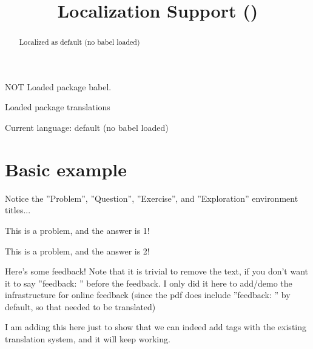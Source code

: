 \documentclass{ximera}
\title{Localization Support (\languagename)}
\providecommand{\languagename}{default (no babel loaded)}
\begin{document}
\begin{abstract}%
    Localized as \languagename
\end{abstract}
\maketitle

\makeatletter
{}       {\phantom{NOT }}{NOT } Loaded package babel.

 Loaded package translations

Current language: \languagename

\makeatother


\section*{Basic example}%
    
        Notice the ''Problem'', ''Question'', ''Exercise'', and ''Exploration'' environment titles... 
        \begin{problem}%
            This is a problem, and the answer is 1! %
            \begin{multipleChoice}
            \end{multipleChoice}%
        \end{problem}
            
        \begin{question}
            This is a problem, and the answer is 2! %
            \begin{selectAll}
            \end{selectAll}%
            \begin{feedback}
                Here's some feedback! Note that it is trivial to remove the text, if you don't want it to say ''feedback: '' before the feedback. I only did it here to add/demo the infrastructure for online feedback (since the pdf does include ''feedback: '' by default, so that needed to be translated)%
            \end{feedback}
            \begin{feedback}[correct]
                I am adding this here just to show that we can indeed add tags with the existing translation system, and it will keep working.%
            \end{feedback}
        \end{question}
            
\end{document}
